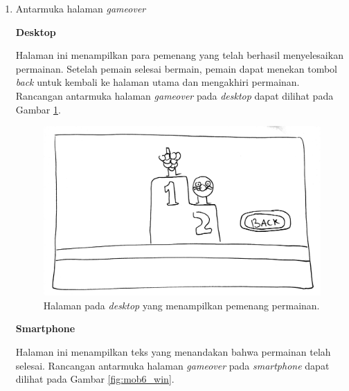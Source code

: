 \begin{enumerate}
\item Antarmuka halaman \textit{gameover}

	\textbf{Desktop}
	
	Halaman ini menampilkan para pemenang yang telah berhasil menyelesaikan permainan. Setelah pemain selesai bermain, pemain dapat menekan tombol \textit{back} untuk kembali ke halaman utama dan mengakhiri permainan. Rancangan antarmuka halaman \textit{gameover} pada \textit{desktop} dapat dilihat pada Gambar \ref{fig:web6_winning}.
	
\begin{figure}[H]
	\centering
	\includegraphics[scale=0.1]{Gambar/web6_winning}
	\caption{Halaman pada \textit{desktop} yang menampilkan pemenang permainan.}
	\label{fig:web6_winning}
\end{figure}

	\textbf{Smartphone}
	
	Halaman ini menampilkan teks yang menandakan bahwa permainan telah selesai. Rancangan antarmuka halaman \textit{gameover} pada \textit{smartphone} dapat dilihat pada Gambar \ref{fig:mob6_win}.
	

\end{enumerate}
